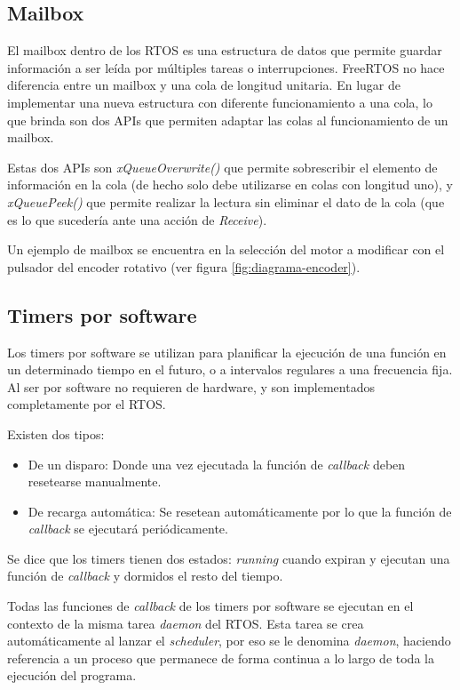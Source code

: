 \documentclass{IEEEtran}
\begin{document}
\subsection{Mailbox}
El mailbox dentro de los RTOS es una estructura de datos que permite guardar información a ser leída por múltiples tareas o interrupciones. FreeRTOS no hace diferencia entre un mailbox y una cola de longitud unitaria. En lugar de implementar una nueva estructura con diferente funcionamiento a una cola, lo que brinda son dos APIs que permiten adaptar las colas al funcionamiento de un mailbox.

Estas dos APIs son \textit{xQueueOverwrite()} que permite sobrescribir el elemento de información en la cola (de hecho solo debe utilizarse en colas con longitud uno), y \textit{xQueuePeek()} que permite realizar la lectura sin eliminar el dato de la cola (que es lo que sucedería ante una acción de \textit{Receive}).

Un ejemplo de mailbox se encuentra en la selección del motor a modificar con el pulsador del encoder rotativo (ver figura \ref{fig:diagrama-encoder}).

\subsection{Timers por software}
\label{sec:software-timer}
Los timers por software se utilizan para planificar la ejecución de una función en un determinado tiempo en el futuro, o a intervalos regulares a una frecuencia fija. Al ser por software no requieren de hardware, y son implementados completamente por el RTOS.

Existen dos tipos:
\begin{itemize}
    \item De un disparo: Donde una vez ejecutada la función de \textit{callback} deben resetearse manualmente.
    \item De recarga automática: Se resetean automáticamente por lo que la función de \textit{callback} se ejecutará periódicamente.
\end{itemize}

Se dice que los timers tienen dos estados: \textit{running} cuando expiran y ejecutan una función de \textit{callback} y dormidos el resto del tiempo.

Todas las funciones de \textit{callback} de los timers por software se ejecutan en el contexto de la misma tarea \textit{daemon} del RTOS. Esta tarea se crea automáticamente al lanzar el \textit{scheduler}, por eso se le denomina \textit{daemon}, haciendo referencia a un proceso que permanece de forma continua a lo largo de toda la ejecución del programa.
\end{document}
